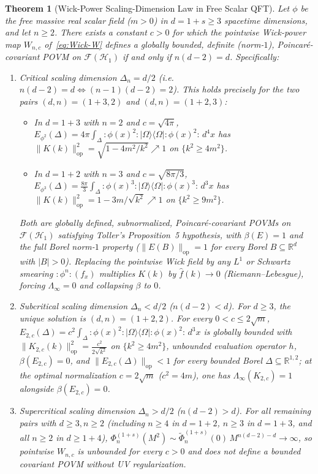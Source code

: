\documentclass[11pt,a4paper]{article}
\newtheorem{theorem}{Theorem}[section]
\theoremstyle{definition}
\theoremstyle{remark}
\newcommand{\HH}{\mathcal{H}}
\newcommand{\RR}{\mathbb{R}}
\newcommand{\op}{\mathrm{op}}
\newcommand{\ket}[1]{|#1\rangle}
\newcommand{\bra}[1]{\langle #1|}
\newcommand{\norm}[1]{\|#1\|}
\begin{document}
\begin{theorem}[Wick-Power Scaling-Dimension Law in Free Scalar QFT]\label{thm:wick}
Let $\phi$ be the free massive real scalar field ($m>0$) in $d=1+s\ge 3$ spacetime dimensions, and let $n\ge 2$. There exists a constant $c>0$ for which the pointwise Wick-power map $W_{n,c}$ of~\eqref{eq:Wick-W} defines a globally bounded, definite (norm-$1$), Poincar\'e-covariant POVM on $\mathcal{F}(\HH_1)$ if and only if $n(d-2)=d$. Specifically:
\begin{enumerate}[label=\textup{(\roman*)},leftmargin=*]
\item \emph{Critical scaling dimension $\Delta_n=d/2$ (i.e.\ $n(d-2)=d \iff (n-1)(d-2)=2$).} This holds precisely for the two pairs $(d,n)=(1+3,2)$ and $(d,n)=(1+2,3)$:
\begin{itemize}[leftmargin=*,nosep]
\item In $d=1+3$ with $n=2$ and $c=\sqrt{4\pi}$, $E_{\phi^2}(\Delta)=4\pi\int_\Delta :\!\phi(x)^2\!:\ket{\Omega}\bra{\Omega}:\!\phi(x)^2\!:\,d^4x$ has $\norm{K(k)}_{\op}^2 = \sqrt{1-4m^2/k^2}\nearrow 1$ on $\{k^2\ge 4m^2\}$.
\item In $d=1+2$ with $n=3$ and $c=\sqrt{8\pi/3}$, $E_{\phi^3}(\Delta)=\frac{8\pi}{3}\int_\Delta :\!\phi(x)^3\!:\ket{\Omega}\bra{\Omega}:\!\phi(x)^3\!:\,d^3x$ has $\norm{K(k)}_{\op}^2 = 1-3m/\sqrt{k^2}\nearrow 1$ on $\{k^2\ge 9m^2\}$.
\end{itemize}
Both are globally defined, subnormalized, Poincar\'e-covariant POVMs on $\mathcal{F}(\HH_1)$ satisfying Toller's Proposition~5 hypothesis, with $\beta(E)=1$ and the full Borel norm-$1$ property ($\norm{E(B)}_{\op}=1$ for every Borel $B\subseteq\RR^d$ with $|B|>0$). Replacing the pointwise Wick field by any $L^1$ or Schwartz smearing $:\!\phi^n\!:(f_x)$ multiplies $K(k)$ by $\widehat{f}(k)\to 0$ (Riemann--Lebesgue), forcing $\Lambda_\infty=0$ and collapsing $\beta$ to $0$.
\item \emph{Subcritical scaling dimension $\Delta_n<d/2$ ($n(d-2)<d$).} For $d\ge 3$, the unique solution is $(d,n)=(1+2,2)$. For every $0<c\le 2\sqrt{m}$, $E_{2,c}(\Delta)=c^2\int_\Delta :\!\phi(x)^2\!:\ket{\Omega}\bra{\Omega}:\!\phi(x)^2\!:\,d^3x$ is globally bounded with $\norm{K_{2,c}(k)}_{\op}^2 = \frac{c^2}{2\sqrt{k^2}}$ on $\{k^2\ge 4m^2\}$, unbounded evaluation operator $h$, $\beta(E_{2,c})=0$, and $\norm{E_{2,c}(\Delta)}_{\op}<1$ for every bounded Borel $\Delta\subseteq\RR^{1,2}$; at the optimal normalization $c=2\sqrt{m}$ ($c^2=4m$), one has $\Lambda_\infty(K_{2,c})=1$ alongside $\beta(E_{2,c})=0$.
\item \emph{Supercritical scaling dimension $\Delta_n>d/2$ ($n(d-2)>d$).} For all remaining pairs with $d\ge 3, n\ge 2$ (including $n\ge 4$ in $d=1+2$, $n\ge 3$ in $d=1+3$, and all $n\ge 2$ in $d\ge 1+4$), $\Phi_n^{(1+s)}(M^2)\sim \widetilde{\Phi}_n^{(1+s)}(0)\,M^{n(d-2)-d}\to\infty$, so pointwise $W_{n,c}$ is unbounded for every $c>0$ and does not define a bounded covariant POVM without UV regularization.
\end{enumerate}
\end{theorem}
\end{document}

